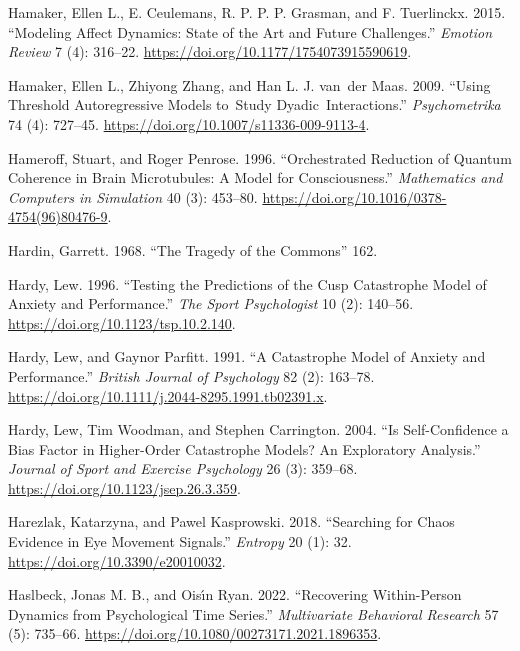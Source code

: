 \documentclass[
  a4paper,
  DIV=11,
  numbers=noendperiod,
  oneside]{scrreprt}
\newlength{\cslhangindent}
\newenvironment{CSLReferences}[2] %
 {\begin{list}{}{%
  \setlength{\itemindent}{0pt}
  \setlength{\leftmargin}{0pt}
  \setlength{\parsep}{0pt}
  \ifodd #1
   \setlength{\leftmargin}{\cslhangindent}
   \setlength{\itemindent}{-1\cslhangindent}
  \fi
  \setlength{\itemsep}{#2\baselineskip}}}
 {\end{list}}
\begin{document}
\begin{CSLReferences}{1}{0}
Hamaker, Ellen L., E. Ceulemans, R. P. P. P. Grasman, and F. Tuerlinckx.
2015. {``Modeling {Affect Dynamics}: {State} of the {Art} and {Future
Challenges}.''} \emph{Emotion Review} 7 (4): 316--22.
\url{https://doi.org/10.1177/1754073915590619}.

Hamaker, Ellen L., Zhiyong Zhang, and Han L. J. van~der Maas. 2009.
{``Using Threshold Autoregressive Models to~Study
Dyadic~Interactions.''} \emph{Psychometrika} 74 (4): 727--45.
\url{https://doi.org/10.1007/s11336-009-9113-4}.

Hameroff, Stuart, and Roger Penrose. 1996. {``Orchestrated Reduction of
Quantum Coherence in Brain Microtubules: {A} Model for Consciousness.''}
\emph{Mathematics and Computers in Simulation} 40 (3): 453--80.
\url{https://doi.org/10.1016/0378-4754(96)80476-9}.

Hardin, Garrett. 1968. {``The {Tragedy} of the {Commons}''} 162.

Hardy, Lew. 1996. {``Testing the {Predictions} of the {Cusp Catastrophe
Model} of {Anxiety} and {Performance}.''} \emph{The Sport Psychologist}
10 (2): 140--56. \url{https://doi.org/10.1123/tsp.10.2.140}.

Hardy, Lew, and Gaynor Parfitt. 1991. {``A Catastrophe Model of Anxiety
and Performance.''} \emph{British Journal of Psychology} 82 (2):
163--78. \url{https://doi.org/10.1111/j.2044-8295.1991.tb02391.x}.

Hardy, Lew, Tim Woodman, and Stephen Carrington. 2004. {``Is
Self-Confidence a Bias Factor in Higher-Order Catastrophe Models? An
Exploratory Analysis.''} \emph{Journal of Sport and Exercise Psychology}
26 (3): 359--68. \url{https://doi.org/10.1123/jsep.26.3.359}.

Harezlak, Katarzyna, and Pawel Kasprowski. 2018. {``Searching for Chaos
Evidence in Eye Movement Signals.''} \emph{Entropy} 20 (1): 32.
\url{https://doi.org/10.3390/e20010032}.

Haslbeck, Jonas M. B., and Oisı́n Ryan. 2022. {``Recovering
{Within-Person Dynamics} from {Psychological Time Series}.''}
\emph{Multivariate Behavioral Research} 57 (5): 735--66.
\url{https://doi.org/10.1080/00273171.2021.1896353}.


\end{CSLReferences}
\end{document}
